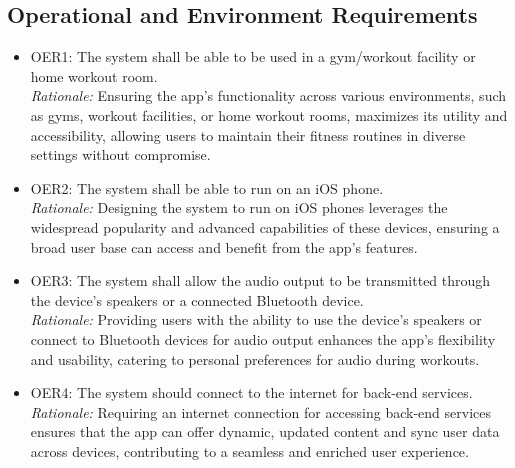 \documentclass[12pt]{article}
\begin{document}
\subsection{Operational and Environment Requirements}
\begin{itemize}
\item OER1: The system shall be able to be used in a gym/workout facility or home workout room.\\
\textit{Rationale:} Ensuring the app's functionality across various environments, such as gyms, workout facilities, or home workout rooms, maximizes its utility and accessibility, allowing users to maintain their fitness routines in diverse settings without compromise.
\item OER2: The system shall be able to run on an iOS phone.\\
\textit{Rationale:} Designing the system to run on iOS phones leverages the widespread popularity and advanced capabilities of these devices, ensuring a broad user base can access and benefit from the app's features.
\item OER3: The system shall allow the audio output to be transmitted through the device’s speakers or a connected Bluetooth device.\\
\textit{Rationale:} Providing users with the ability to use the device’s speakers or connect to Bluetooth devices for audio output enhances the app's flexibility and usability, catering to personal preferences for audio during workouts.
\item OER4: The system should connect to the internet for back-end services.\\
\textit{Rationale:} Requiring an internet connection for accessing back-end services ensures that the app can offer dynamic, updated content and sync user data across devices, contributing to a seamless and enriched user experience.
\end{itemize}
\end{document}
